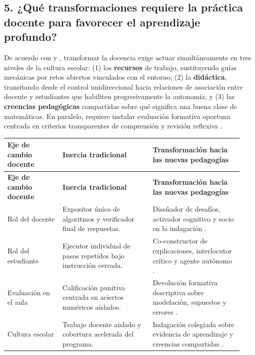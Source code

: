 \documentclass[spanish,letterpaper,oneside]{article}
\begin{document}
\subsection*{5. ¿Qué transformaciones requiere la práctica docente para favorecer el aprendizaje profundo?}
De acuerdo con \citet{quiroga2022aprendizaje} y \citet{fullan2014rich}, transformar la docencia exige actuar simultáneamente en tres niveles de la cultura escolar: (1) los \textbf{recursos} de trabajo, sustituyendo guías mecánicas por retos abiertos vinculados con el entorno; (2) la \textbf{didáctica}, transitando desde el control unidireccional hacia relaciones de asociación entre docente y estudiantes que habiliten progresivamente la autonomía; y (3) las \textbf{creencias pedagógicas} compartidas sobre qué significa una buena clase de matemáticas. En paralelo, requiere instalar evaluación formativa oportuna centrada en criterios transparentes de comprensión y revisión reflexiva \citep{eef2021feedback,bostrom2023formative}.

{\small{}\renewcommand{\arraystretch}{1.32}
\begin{longtable}{|>{\raggedright\arraybackslash}p{0.22\linewidth}|>{\raggedright\arraybackslash}p{0.36\linewidth}|>{\raggedright\arraybackslash}p{0.36\linewidth}|}\hline
\rowcolor{iiiepePale} \textbf{Eje de cambio docente} & \textbf{Inercia tradicional} & \textbf{Transformación hacia las nuevas pedagogías} \\\hline
\endfirsthead
\hline
\rowcolor{iiiepePale} \textbf{Eje de cambio docente} & \textbf{Inercia tradicional} & \textbf{Transformación hacia las nuevas pedagogías} \\\hline
\endhead
Rol del docente & Expositor único de algoritmos y verificador final de respuestas. & Diseñador de desafíos, activador cognitivo y socio en la indagación \citep{fullan2014rich}. \\\hline
Rol del estudiante & Ejecutor individual de pasos repetidos bajo instrucción cerrada. & Co-constructor de explicaciones, interlocutor crítico y agente autónomo \citep{quiroga2022aprendizaje}. \\\hline
Evaluación en el aula & Calificación punitiva centrada en aciertos numéricos aislados. & Devolución formativa descriptiva sobre modelación, supuestos y errores \citep{bostrom2023formative}. \\\hline
Cultura escolar & Trabajo docente aislado y cobertura acelerada del programa. & Indagación colegiada sobre evidencia de aprendizaje y creencias compartidas \citep{quiroga2022aprendizaje}. \\\hline
\end{longtable}}
\end{document}

